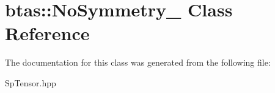 \hypertarget{classbtas_1_1_no_symmetry__}{
\section{btas::NoSymmetry\_\- Class Reference}
\label{classbtas_1_1_no_symmetry__}
}


The documentation for this class was generated from the following file:\begin{DoxyCompactItemize}
\item 
SpTensor.hpp\end{DoxyCompactItemize}
